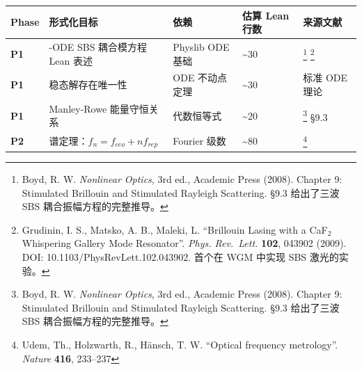 \documentclass[
  11pt,
  a4paper,
]{ctexrep}
\newcounter{none} %
\begin{document}
{\def\LTcaptype{none} %
\begin{longtable}[]{@{}
  >{\raggedright\arraybackslash}p{}
  >{\raggedright\arraybackslash}p{}
  >{\raggedright\arraybackslash}p{}
  >{\centering\arraybackslash}p{}
  >{\raggedright\arraybackslash}p{}@{}}
\toprule\noalign{}
\begin{minipage}[b]{\linewidth}\raggedright
Phase
\end{minipage} & \begin{minipage}[b]{\linewidth}\raggedright
形式化目标
\end{minipage} & \begin{minipage}[b]{\linewidth}\raggedright
依赖
\end{minipage} & \begin{minipage}[b]{\linewidth}\centering
估算 Lean 行数
\end{minipage} & \begin{minipage}[b]{\linewidth}\raggedright
来源文献
\end{minipage} \\
\midrule\noalign{}
\endhead
\bottomrule\noalign{}
\endlastfoot
\textbf{P1} & 3-ODE SBS 耦合模方程 Lean 表述 & Physlib ODE 基础 &
\textasciitilde30 & \footnote{Boyd, R. W. \emph{Nonlinear Optics}, 3rd
  ed., Academic Press (2008). Chapter 9: Stimulated Brillouin and
  Stimulated Rayleigh Scattering. §9.3 给出了三波 SBS
  耦合振幅方程的完整推导。} \footnote{Grudinin, I. S., Matsko, A. B.,
  Maleki, L. ``Brillouin Lasing with a CaF\(_2\) Whispering Gallery Mode
  Resonator''. \emph{Phys. Rev.~Lett.} \textbf{102}, 043902 (2009). DOI:
  10.1103/PhysRevLett.102.043902. 首个在 WGM 中实现 SBS 激光的实验。} \\
\textbf{P1} & 稳态解存在唯一性 & ODE 不动点定理 & \textasciitilde30 &
标准 ODE 理论 \\
\textbf{P1} & Manley-Rowe 能量守恒关系 & 代数恒等式 & \textasciitilde20
& \footnote{Boyd, R. W. \emph{Nonlinear Optics}, 3rd ed., Academic Press
  (2008). Chapter 9: Stimulated Brillouin and Stimulated Rayleigh
  Scattering. §9.3 给出了三波 SBS 耦合振幅方程的完整推导。} §9.3 \\
\textbf{P2} & 谱定理：\(f_n = f_{ceo} + n f_{rep}\) & Fourier 级数 &
\textasciitilde80 & \footnote{Udem, Th., Holzwarth, R., Hänsch, T. W.
  ``Optical frequency metrology''. \emph{Nature} \textbf{416}, 233--237
}
\end{longtable}}
\end{document}
